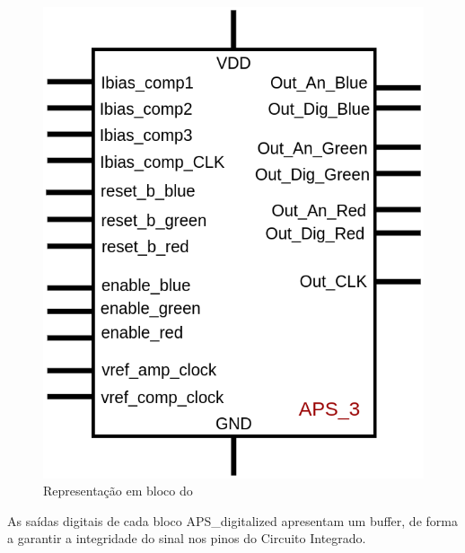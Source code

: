 \begin{figure}[htb]
 \centering
    \centering
    \caption{Representa{\c c}\~ao em bloco do \NomeBloco} \label{\NomeSFig}
    \includegraphics[scale=0.3]{Circuitos/APS_3_block.png}
\end{figure}

As sa\'idas digitais de cada bloco APS\_digitalized apresentam um buffer, de forma a garantir a integridade do sinal nos pinos do Circuito Integrado.

